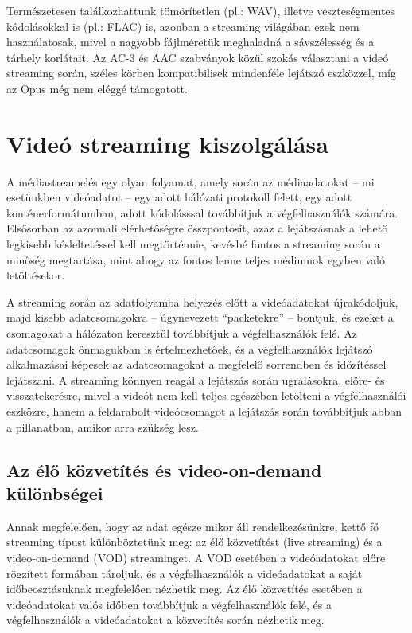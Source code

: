 Természetesen találkozhattunk tömörítetlen (pl.: WAV), illetve veszteségmentes kódolásokkal is (pl.: FLAC) is, azonban a streaming világában ezek nem használatosak, mivel a nagyobb fájlméretük meghaladná a sávszélesség és a tárhely korlátait. Az AC-3 és AAC szabványok közül szokás választani a videó streaming során, széles körben kompatibilisek mindenféle lejátszó eszközzel, míg az Opus még nem eléggé támogatott.

\section{Videó streaming kiszolgálása}

A médiastreamelés egy olyan folyamat, amely során az médiaadatokat -- mi esetünkben videóadatot -- egy adott hálózati protokoll felett, egy adott konténerformátumban, adott kódolásssal továbbítjuk a végfelhasználók számára. Elsősorban az azonnali elérhetőségre összpontosít, azaz a lejátszásnak a lehető legkisebb késleltetéssel kell megtörténnie, kevésbé fontos a streaming során a minőség megtartása, mint ahogy az fontos lenne teljes médiumok egyben való letöltésekor.

A streaming során az adatfolyamba helyezés előtt a videóadatokat újrakódoljuk, majd kisebb adatcsomagokra -- úgynevezett ``packetekre'' -- bontjuk, és ezeket a csomagokat a hálózaton keresztül továbbítjuk a végfelhasználók felé. Az adatcsomagok önmagukban is értelmezhetőek, és a végfelhasználók lejátszó alkalmazásai képesek az adatcsomagokat a megfelelő sorrendben és időzítéssel lejátszani. A streaming könnyen reagál a lejátszás során ugrálásokra, előre- és visszatekerésre, mivel a videót nem kell teljes egészében letölteni a végfelhasználói eszközre, hanem a feldarabolt videócsomagot a lejátszás során továbbítjuk abban a pillanatban, amikor arra szükség lesz.

\subsection{Az élő közvetítés és video-on-demand különbségei}

Annak megfelelően, hogy az adat egésze mikor áll rendelkezésünkre, kettő fő streaming típust különböztetünk meg: az élő közvetítést (live streaming) és a video-on-demand (VOD) streaminget. A VOD esetében a videóadatokat előre rögzített formában tároljuk, és a végfelhasználók a videóadatokat a saját időbeosztásuknak megfelelően nézhetik meg. Az élő közvetítés esetében a videóadatokat valós időben továbbítjuk a végfelhasználók felé, és a végfelhasználók a videóadatokat a közvetítés során nézhetik meg.

